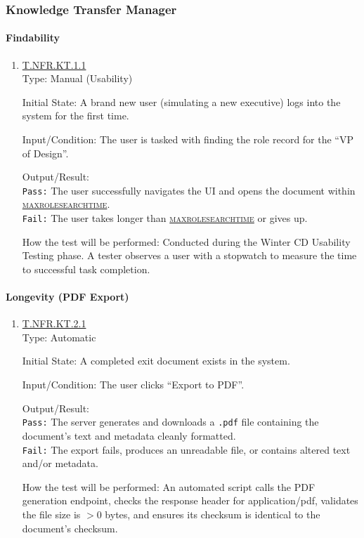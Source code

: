 \documentclass[12pt, titlepage]{article}
\newcommand{\testdef}[1]{\leavevmode\hypertarget{test:#1}{}\hyperlink{trace:#1}{#1}}
\DeclareRobustCommand{\cname}[1]{{\renewcommand{\_}{\textunderscore\allowbreak}\textsc{#1}}}
\newcommand{\constfirst}[1]{\leavevmode\hypertarget{constfirst:\detokenize{#1}}{}\hyperlink{const:\detokenize{#1}}{\cname{#1}}}
\newcommand{\const}[1]{\hyperlink{const:\detokenize{#1}}{\cname{#1}}}
\begin{document}
\subsubsection{Knowledge Transfer Manager}

\paragraph{Findability}
\begin{enumerate}
  \item \testdef{T.NFR.KT.1.1}\\
  Type: Manual (Usability)

  Initial State: A brand new user (simulating a new executive) logs into the system for the first time.

  Input/Condition: The user is tasked with finding the role record for the ``VP of Design''.

  Output/Result: \\
  \texttt{Pass:} The user successfully navigates the UI and opens the document within \constfirst{max\_role\_search\_time}.\\
  \texttt{Fail:} The user takes longer than \const{max\_role\_search\_time} or gives up.

  How the test will be performed: Conducted during the Winter CD Usability Testing phase. A tester observes a user with a stopwatch to measure the time to successful task completion.
\end{enumerate}

\paragraph{Longevity (PDF Export)}
\begin{enumerate}
  \item \testdef{T.NFR.KT.2.1}\\
  Type: Automatic

  Initial State: A completed exit document exists in the system.

  Input/Condition: The user clicks ``Export to PDF''.

  Output/Result: \\
  \texttt{Pass:} The server generates and downloads a \texttt{.pdf} file containing the document's text and metadata cleanly formatted.\\
  \texttt{Fail:} The export fails, produces an unreadable file, or contains altered text and/or metadata.

  How the test will be performed: An automated script calls the PDF generation endpoint, checks the response header for application/pdf, validates the file size is $> 0$ bytes, and ensures its checksum is identical to the document's checksum.
\end{enumerate}
\end{document}
